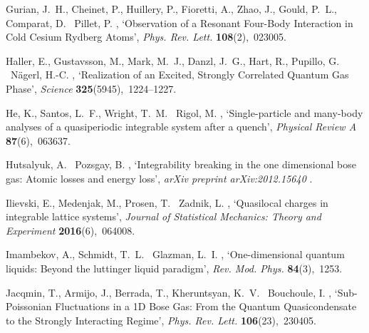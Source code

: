 \documentclass[onecolumn,amsfonts,showpacs,superscriptaddress]{revtex4-1}
\begin{document}
\begin{thebibliography}{xx}
Gurian, J.~H., Cheinet, P., Huillery, P., Fioretti, A., Zhao, J., Gould, P.~L.,
  Comparat, D. \harvardand\ Pillet, P.  \harvardyearright
  , `Observation of a {Resonant} {Four}-{Body} {Interaction} in {Cold} {Cesium}
  {Rydberg} {Atoms}', {\em Phys. Rev. Lett.} {\bf 108}(2),~023005.

Haller, E., Gustavsson, M., Mark, M.~J., Danzl, J.~G., Hart, R., Pupillo, G.
  \harvardand\ Nägerl, H.-C.  \harvardyearright ,
  `Realization of an {Excited}, {Strongly} {Correlated} {Quantum} {Gas}
  {Phase}', {\em Science} {\bf 325}(5945),~1224--1227.

He, K., Santos, L.~F., Wright, T.~M. \harvardand\ Rigol, M.  \harvardyearleft
  2013\harvardyearright , `Single-particle and many-body analyses of a
  quasiperiodic integrable system after a quench', {\em Physical Review A} {\bf
  87}(6),~063637.

Hutsalyuk, A. \harvardand\ Pozsgay, B.  \harvardyearleft 2020\harvardyearright
  , `Integrability breaking in the one dimensional bose gas: Atomic losses and
  energy loss', {\em arXiv preprint arXiv:2012.15640} .

Ilievski, E., Medenjak, M., Prosen, T. \harvardand\ Zadnik, L.
  \harvardyearleft 2016\harvardyearright , `Quasilocal charges in integrable
  lattice systems', {\em Journal of Statistical Mechanics: Theory and
  Experiment} {\bf 2016}(6),~064008.

Imambekov, A., Schmidt, T.~L. \harvardand\ Glazman, L.~I.  \harvardyearleft
  2012\harvardyearright , `One-dimensional quantum liquids: Beyond the
  luttinger liquid paradigm', {\em Rev. Mod. Phys.} {\bf 84}(3),~1253.

Jacqmin, T., Armijo, J., Berrada, T., Kheruntsyan, K.~V. \harvardand\
  Bouchoule, I.  \harvardyearright , `Sub-{Poissonian}
  {Fluctuations} in a {1D} {Bose} {Gas}: {From} the {Quantum} {Quasicondensate}
  to the {Strongly} {Interacting} {Regime}', {\em Phys. Rev. Lett.} {\bf
  106}(23),~230405.


\end{thebibliography}
\end{document}
